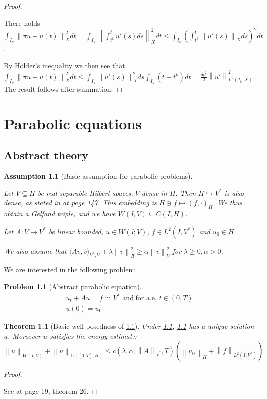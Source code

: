 \documentclass[english,a4paper,10pt,oneside]{scrbook}	%
\theoremstyle{break}
\newtheorem{thm}[equation]{Theorem}
\newtheorem{ass}[equation]{Assumption}
\newtheorem{pb}[equation]{Problem}
\newenvironment{mproof}[1][\proofname]{%
  \begin{proof}[#1]$ $\par\nobreak\ignorespaces
}{%
  \end{proof}
}
\renewcommand*{\proofname}{Proof}
\theoremstyle{remark}
\newcommand{\ds}{\displaystyle}
\newcommand{\norm}[1]{\left\lVert#1\right\rVert}
\newcommand{\HN}[1]{\norm{#1}_{H}}
\newcommand{\VN}[1]{\norm{#1}_{V}}
\newcommand{\VSN}[1]{\norm{#1}_{V^*}}
\begin{document}
\begin{mproof}
There holds $\ds \int_{I_k}\norm{\pi u - u(t)}_X^2 dt = \int_{I_k} \norm{\int_{t^k}^{t} u'(s)ds}_X^2 dt\leq \int_{I_k}\left ( \int_{t^k}^{t} \norm{u'(s)}_X ds \right )^2 dt$. 

By Hölder's inequality we then see that $ \ds \int_{I_k}\norm{\pi u - u(t)}_X^2 dt \leq  \int_{I_k} \norm{u'(s)}_X^2 ds  \int_{I_k}(t-t^k)dt = \frac{\delta t ^2}{2} \norm{u'}_{L^2(I_k,X)}^2$. The result follows after summation.
\end{mproof}

\chapter{Parabolic equations}
\label{chap:parab_eq}

\section{Abstract theory}

\begin{ass}[Basic assumption for parabolic problems]
\label{ass:basic_par}

Let $V\subseteq H$ be real separable Hilbert spaces, $V$ dense in $H$. Then $H\hookrightarrow V^*$ is also dense, as stated in \cite{trol} at page 147. This embedding is $H \ni f \mapsto (f, \cdot )_H$. We thus obtain a Gelfand triple, and we have $W(I,V)\subseteq C(I,H)$.

Let $A:V\rightarrow V^* $ be linear bounded, $u \in W(I;V)$, $f \in L^2(I,V^*)$ and $u_0 \in H$.

We also assume that $\langle Av, v \rangle_{V^*,V}+ \lambda \HN{v}^2\geq \alpha \VN{v}^2$ for $\lambda \geq 0, \alpha >0$.
\end{ass}

We are interested in the following problem:

\begin{pb}[Abstract parabolic equation]
\label{eqn:general_parabolic}
\begin{align}
	u_t+Au=f \text{ in }V^* \text{ and for a.e. } t \in (0,T)\\
	u(0)=u_0
\end{align}
\end{pb}

\begin{thm}[Basic well posedness of \cref{eqn:general_parabolic}]
\label{thm:well_pos_parabolic}
Under \cref{ass:basic_par}, \cref{eqn:general_parabolic} has a unique solution $u$. Moreover $u$ satisfies the energy estimate:
\begin{equation}
	\label{eqn:en_est}
	\norm{u}_{W(I,V)} + \norm{u}_{C([0,T],H)}\leq c(\lambda, \alpha, \VSN{A}, T)(\HN{u_0}+\norm{f}_{L^2(I,V^*)})
\end{equation} 
\end{thm}
\begin{mproof}
See \cite{gilardi} at page 19, theorem 26.
\end{mproof}
\end{document}
